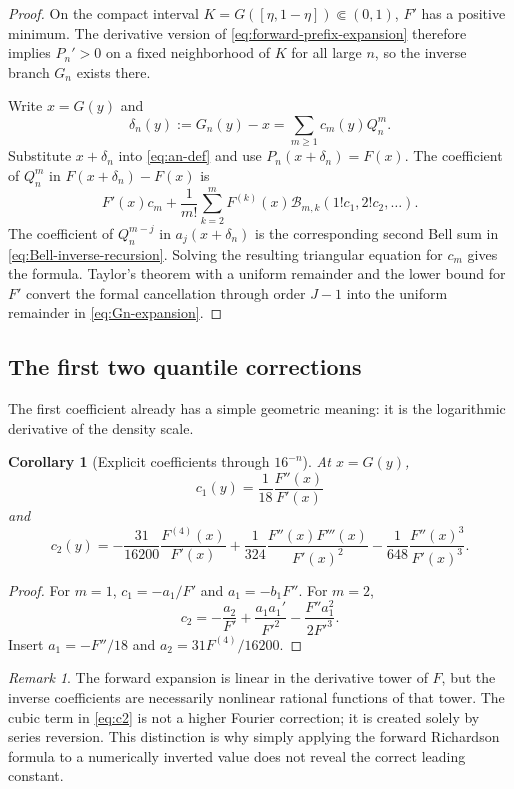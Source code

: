 \documentclass[11pt,oneside]{article}
\numberwithin{equation}{section}
\newtheorem{corollary}[theorem]{Corollary}
\theoremstyle{definition}
\theoremstyle{remark}
\newtheorem{remark}[theorem]{Remark}
\newcommand{\InvF}{G}
\newcommand{\Fn}{P_n}
\newcommand{\Gn}{G_n}
\begin{document}
\begin{proof}
On the compact interval $K=\InvF([\eta,1-\eta])\Subset(0,1)$, $F'$ has a
positive minimum.  The derivative version of \eqref{eq:forward-prefix-expansion}
therefore implies $\Fn'>0$ on a fixed neighborhood of $K$ for all large $n$,
so the inverse branch $\Gn$ exists there.

Write $x=\InvF(y)$ and
\[
 \delta_n(y):=\Gn(y)-x=\sum_{m\ge1}c_m(y)Q_n^m.
\]
Substitute $x+\delta_n$ into \eqref{eq:an-def} and use
$\Fn(x+\delta_n)=F(x)$.  The coefficient of $Q_n^m$ in
$F(x+\delta_n)-F(x)$ is
\[
 F'(x)c_m+\frac1{m!}\sum_{k=2}^{m}F^{(k)}(x)
 \mathcal B_{m,k}(1!c_1,2!c_2,\ldots).
\]
The coefficient of $Q_n^{m-j}$ in $a_j(x+\delta_n)$ is the corresponding
second Bell sum in \eqref{eq:Bell-inverse-recursion}.  Solving the resulting
triangular equation for $c_m$ gives the formula.  Taylor's theorem with a
uniform remainder and the lower bound for $F'$ convert the formal cancellation
through order $J-1$ into the uniform remainder in \eqref{eq:Gn-expansion}.
\end{proof}

\subsection{The first two quantile corrections}

The first coefficient already has a simple geometric meaning: it is the logarithmic
derivative of the density scale.

\begin{corollary}[Explicit coefficients through $16^{-n}$]
\label{cor:c1-c2}
At $x=\InvF(y)$,
\begin{equation}
 \boxed{c_1(y)=\frac1{18}\frac{F''(x)}{F'(x)}}
 \label{eq:c1}
\end{equation}
and
\begin{equation}
 \boxed{
 c_2(y)=
 -\frac{31}{16200}\frac{F^{(4)}(x)}{F'(x)}
 +\frac1{324}\frac{F''(x)F'''(x)}{F'(x)^2}
 -\frac1{648}\frac{F''(x)^3}{F'(x)^3}.}
 \label{eq:c2}
\end{equation}
\end{corollary}

\begin{proof}
For $m=1$, $c_1=-a_1/F'$ and $a_1=-b_1F''$.  For $m=2$,
\[
 c_2=-\frac{a_2}{F'}+\frac{a_1a_1'}{F'^2}
 -\frac{F''a_1^2}{2F'^3}.
\]
Insert $a_1=-F''/18$ and $a_2=31F^{(4)}/16200$.
\end{proof}

\begin{remark}
The forward expansion is linear in the derivative tower of $F$, but the inverse
coefficients are necessarily nonlinear rational functions of that tower.  The cubic
term in \eqref{eq:c2} is not a higher Fourier correction; it is created solely by
series reversion.  This distinction is why simply applying the forward Richardson
formula to a numerically inverted value does not reveal the correct leading constant.
\end{remark}
\end{document}

